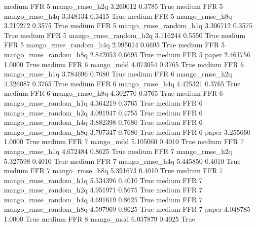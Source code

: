     medium      FFR                 5        mango_rmse_h2q   3.260012      0.3785    True
    medium      FFR                 5        mango_rmse_h4q   3.348134      0.3415    True
    medium      FFR                 5        mango_rmse_h8q   3.219272      0.3575    True
    medium      FFR                 5 mango_rmse_random_h1q   3.306712      0.3575    True
    medium      FFR                 5 mango_rmse_random_h2q   3.116244      0.5550    True
    medium      FFR                 5 mango_rmse_random_h4q   2.995014      0.6695    True
    medium      FFR                 5 mango_rmse_random_h8q   2.842053      0.6695    True
    medium      FFR                 5                 paper   2.461756      1.0000    True
    medium      FFR                 6             mango_mdd   4.073054      0.3765    True
    medium      FFR                 6        mango_rmse_h1q   3.784696      0.7680    True
    medium      FFR                 6        mango_rmse_h2q   4.326087      0.3765    True
    medium      FFR                 6        mango_rmse_h4q   4.425321      0.3765    True
    medium      FFR                 6        mango_rmse_h8q   4.302770      0.3765    True
    medium      FFR                 6 mango_rmse_random_h1q   4.364219      0.3765    True
    medium      FFR                 6 mango_rmse_random_h2q   4.091947      0.4755    True
    medium      FFR                 6 mango_rmse_random_h4q   3.882398      0.7680    True
    medium      FFR                 6 mango_rmse_random_h8q   3.707347      0.7680    True
    medium      FFR                 6                 paper   3.255660      1.0000    True
    medium      FFR                 7             mango_mdd   5.105060      0.4010    True
    medium      FFR                 7        mango_rmse_h1q   4.672484      0.8625    True
    medium      FFR                 7        mango_rmse_h2q   5.327598      0.4010    True
    medium      FFR                 7        mango_rmse_h4q   5.445850      0.4010    True
    medium      FFR                 7        mango_rmse_h8q   5.391673      0.4010    True
    medium      FFR                 7 mango_rmse_random_h1q   5.334396      0.4010    True
    medium      FFR                 7 mango_rmse_random_h2q   4.951971      0.5675    True
    medium      FFR                 7 mango_rmse_random_h4q   4.691619      0.8625    True
    medium      FFR                 7 mango_rmse_random_h8q   4.597969      0.8625    True
    medium      FFR                 7                 paper   4.048785      1.0000    True
    medium      FFR                 8             mango_mdd   6.037879      0.4025    True

